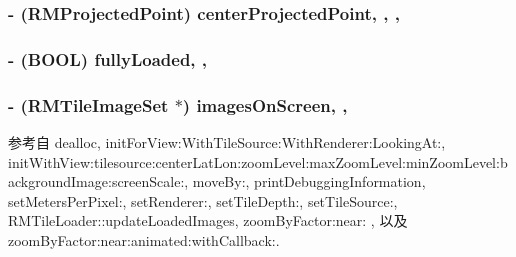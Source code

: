 \hypertarget{interface_r_m_map_contents_ae370cf3845309794b89e5b11290b520e}{
\subsubsection[{center\-Projected\-Point}]{\setlength{\rightskip}{0pt plus 5cm}-\/ ({\bf R\-M\-Projected\-Point}) center\-Projected\-Point\hspace{0.3cm}{\ttfamily [read]}, {\ttfamily [write]}, {\ttfamily [atomic]}, {\ttfamily [assign]}}}\label{interface_r_m_map_contents_ae370cf3845309794b89e5b11290b520e}
\hypertarget{interface_r_m_map_contents_af81fdb306fe5675cc9ebc223379c773a}{
\subsubsection[{fully\-Loaded}]{\setlength{\rightskip}{0pt plus 5cm}-\/ (B\-O\-O\-L) fully\-Loaded\hspace{0.3cm}{\ttfamily [read]}, {\ttfamily [atomic]}, {\ttfamily [assign]}}}\label{interface_r_m_map_contents_af81fdb306fe5675cc9ebc223379c773a}
\hypertarget{interface_r_m_map_contents_a4da52b65a26cd078dfa90c2d348c58c0}{
\subsubsection[{images\-On\-Screen}]{\setlength{\rightskip}{0pt plus 5cm}-\/ ({\bf R\-M\-Tile\-Image\-Set} $\ast$) images\-On\-Screen\hspace{0.3cm}{\ttfamily [read]}, {\ttfamily [atomic]}, {\ttfamily [assign]}}}\label{interface_r_m_map_contents_a4da52b65a26cd078dfa90c2d348c58c0}


参考自 dealloc, init\-For\-View\-:\-With\-Tile\-Source\-:\-With\-Renderer\-:\-Looking\-At\-:, init\-With\-View\-:tilesource\-:center\-Lat\-Lon\-:zoom\-Level\-:max\-Zoom\-Level\-:min\-Zoom\-Level\-:background\-Image\-:screen\-Scale\-:, move\-By\-:, print\-Debugging\-Information, set\-Meters\-Per\-Pixel\-:, set\-Renderer\-:, set\-Tile\-Depth\-:, set\-Tile\-Source\-:, R\-M\-Tile\-Loader\-::update\-Loaded\-Images, zoom\-By\-Factor\-:near\-: , 以及 zoom\-By\-Factor\-:near\-:animated\-:with\-Callback\-:.

